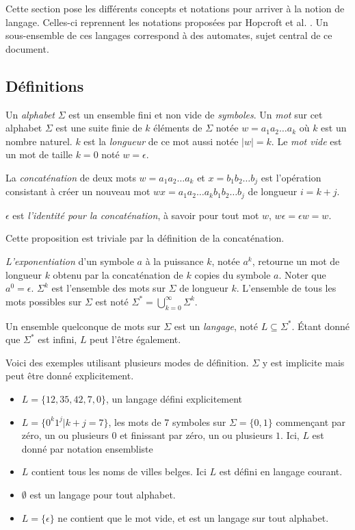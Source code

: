 Cette section pose les différents concepts et notations pour arriver à la notion de langage. Celles-ci reprennent les notations proposées par Hopcroft et al. \cite{Hopcroft00}. Un sous-ensemble de ces langages correspond à des automates, sujet central de ce document.

\subsection{Définitions}

Un \emph{alphabet} $\Sigma$ est un ensemble fini et non vide de \emph{symboles}. Un \emph{mot} sur cet alphabet $\Sigma$ est une suite finie de $k$ éléments de $\Sigma$ notée $ w = a_1a_2\dots a_k$ où $k$ est un nombre naturel. $k$ est la \emph{longueur} de ce mot aussi notée $|w|=k$. Le \emph{mot vide} est un mot de taille $k=0$ noté $w=\epsilon$.

La \emph{concaténation} de deux mots $w=a_1a_2\dots a_k$ et $x=b_1b_2\dots b_j$ est l'opération consistant à créer un nouveau mot $wx=a_1a_2\dots a_kb_1b_2\dots b_j$ de longueur $i=k+j$.

\begin{proposition}
$\epsilon$ est \emph{l'identité pour la concaténation}, à savoir pour tout mot $w$, $w\epsilon = \epsilon w = w$.
\end{proposition}

Cette proposition est triviale par la définition de la concaténation.

\emph{L'exponentiation} d'un symbole $a$ à la puissance $k$, notée $a^k$, retourne un mot de longueur $k$ obtenu par la concaténation de $k$ copies du symbole $a$. Noter que $a^0=\epsilon$. $\Sigma^k$ est l'ensemble des mots sur $\Sigma$ de longueur $k$. L'ensemble de tous les mots possibles sur $\Sigma$ est noté $\Sigma^* = \bigcup_{k=0}^{\infty}\Sigma^k$.


Un ensemble quelconque de mots sur $\Sigma$ est un \emph{langage}, noté $L \subseteq \Sigma^*$. Étant donné que $\Sigma^*$ est infini, $L$ peut l'être également.

\begin{example} Voici des exemples utilisant plusieurs modes de définition. $\Sigma$ y est implicite mais peut être donné explicitement.
	\begin{itemize}
		\item $L=\{12,35,42,7,0\}$, un langage défini explicitement
		\item $L=\{0^k1^j|k+j=7\}$, les mots de 7 symboles sur $\Sigma=\{0,1\}$ commençant par zéro, un ou plusieurs $0$ et finissant par zéro, un ou plusieurs $1$. Ici, $L$ est donné par notation ensembliste
		\item $L$ contient tous les noms de villes belges. Ici $L$ est défini en langage courant.
		\item $\emptyset$ est un langage pour tout alphabet.
		\item $L=\{\epsilon\}$ ne contient que le mot vide, et est un langage sur tout alphabet.
	\end{itemize}
\end{example}


